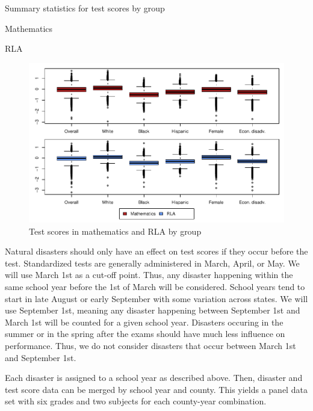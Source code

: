 \begin{table} 
	\caption{Summary statistics for test scores by group}
	\label{SumStats}
	\begin{subtable}{1\textwidth}
		\caption{Mathematics}
		\centering
		
	\end{subtable}

	\bigskip
	\begin{subtable}{1\textwidth}
		\caption{RLA}
		\centering
		
	\end{subtable}
\end{table}


\begin{figure}[!h]
	\centering
	\includegraphics[scale=1]{"../Code & Data/DepVarsBoxplot.pdf"}
	\caption{Test scores in mathematics and RLA by group}
	\label{DepVarsBoxplot}
\end{figure}


Natural disasters should only have an effect on test scores if they occur before the test. Standardized tests are generally administered in March, April, or May. We will use March 1st as a cut-off point. Thus, any disaster happening within the same school year before the 1st of March will be considered. School years tend to start in late August or early September with some variation across states. We will use September 1st, meaning any disaster happening between September 1st and March 1st will be counted for a given school year. Disasters occuring in the summer or in the spring after the exams should have much less influence on performance. Thus, we do not consider disasters that occur between March 1st and September 1st.

Each disaster is assigned to a school year as described above. Then, disaster and test score data can be merged by school year and county. This yields a panel data set with six grades and two subjects for each county-year combination.

